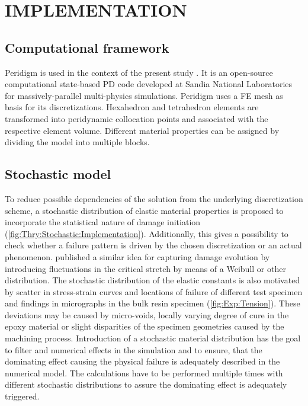 \section{\protect\uppercase{Implementation}}

\subsection{Computational framework}

Peridigm is used in the context of the present study \cite{PeridigmUserGuide100}. It is an open-source computational state-based PD code developed at Sandia National Laboratories for massively-parallel multi-physics simulations. Peridigm uses a FE mesh as basis for its discretizations. Hexahedron and tetrahedron elements are transformed into peridynamic collocation points and associated with the respective element volume. Different material properties can be assigned by dividing the model into multiple blocks.

\subsection{Stochastic model}

To reduce possible dependencies of the solution from the underlying discretization scheme, a stochastic distribution of elastic material properties is proposed to incorporate the statistical nature of damage initiation (\autoref{fig:Thry:Stochastic:Implementation}). Additionally, this gives a possibility to check whether a failure pattern is driven by the chosen discretization or an actual phenomenon. \cite{SillingSA2007b} published a similar idea for capturing damage evolution by introducing fluctuations in the critical stretch by means of a Weibull or other distribution. The stochastic distribution of the elastic constants is also motivated by scatter in stress-strain curves and locations of failure of different test specimen and findings in micrographs in the bulk resin specimen (\autoref{fig:Exp:Tension}). These deviations may be caused by micro-voids, locally varying degree of cure in the epoxy material or slight disparities of the specimen geometries caused by the machining process. Introduction of a stochastic material distribution has the goal to filter and numerical effects in the simulation and to ensure, that the dominating effect causing the physical failure is adequately described in the numerical model. The calculations have to be performed multiple times with different stochastic distributions to assure the dominating effect is adequately triggered.

